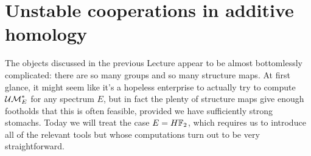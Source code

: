 





\section{Unstable cooperations in additive homology}\label{UnstableSteenrodCoops}

The objects discussed in the previous Lecture appear to be almost bottomlessly complicated: there are so many groups and so many structure maps.  At first glance, it might seem like it's a hopeless enterprise to actually try to compute $\mathcal{UM}_{E}^*$ for any spectrum $E$, but in fact the plenty of structure maps give enough footholds that this is often feasible, provided we have sufficiently strong stomachs.  Today we will treat the case $E = H\mathbb F_2$, which requires us to introduce all of the relevant tools but whose computations turn out to be very straightforward.

